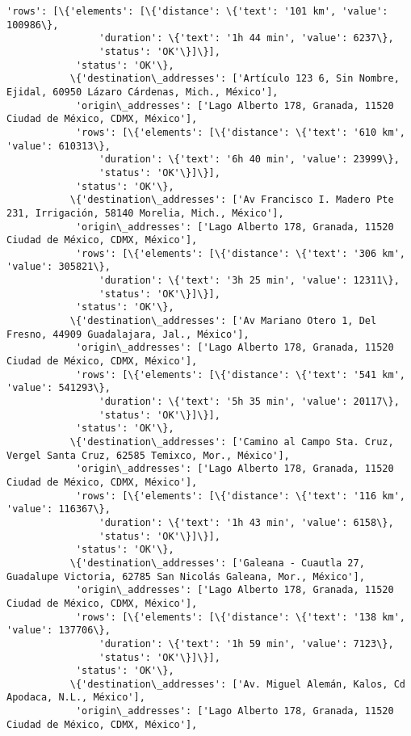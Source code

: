 \documentclass[11pt]{article}
\begin{document}
\begin{Verbatim}[commandchars=\\\{\}]
            'rows': [\{'elements': [\{'distance': \{'text': '101 km', 'value': 100986\},
                'duration': \{'text': '1h 44 min', 'value': 6237\},
                'status': 'OK'\}]\}],
            'status': 'OK'\},
           \{'destination\_addresses': ['Artículo 123 6, Sin Nombre, Ejidal, 60950 Lázaro Cárdenas, Mich., México'],
            'origin\_addresses': ['Lago Alberto 178, Granada, 11520 Ciudad de México, CDMX, México'],
            'rows': [\{'elements': [\{'distance': \{'text': '610 km', 'value': 610313\},
                'duration': \{'text': '6h 40 min', 'value': 23999\},
                'status': 'OK'\}]\}],
            'status': 'OK'\},
           \{'destination\_addresses': ['Av Francisco I. Madero Pte 231, Irrigación, 58140 Morelia, Mich., México'],
            'origin\_addresses': ['Lago Alberto 178, Granada, 11520 Ciudad de México, CDMX, México'],
            'rows': [\{'elements': [\{'distance': \{'text': '306 km', 'value': 305821\},
                'duration': \{'text': '3h 25 min', 'value': 12311\},
                'status': 'OK'\}]\}],
            'status': 'OK'\},
           \{'destination\_addresses': ['Av Mariano Otero 1, Del Fresno, 44909 Guadalajara, Jal., México'],
            'origin\_addresses': ['Lago Alberto 178, Granada, 11520 Ciudad de México, CDMX, México'],
            'rows': [\{'elements': [\{'distance': \{'text': '541 km', 'value': 541293\},
                'duration': \{'text': '5h 35 min', 'value': 20117\},
                'status': 'OK'\}]\}],
            'status': 'OK'\},
           \{'destination\_addresses': ['Camino al Campo Sta. Cruz, Vergel Santa Cruz, 62585 Temixco, Mor., México'],
            'origin\_addresses': ['Lago Alberto 178, Granada, 11520 Ciudad de México, CDMX, México'],
            'rows': [\{'elements': [\{'distance': \{'text': '116 km', 'value': 116367\},
                'duration': \{'text': '1h 43 min', 'value': 6158\},
                'status': 'OK'\}]\}],
            'status': 'OK'\},
           \{'destination\_addresses': ['Galeana - Cuautla 27, Guadalupe Victoria, 62785 San Nicolás Galeana, Mor., México'],
            'origin\_addresses': ['Lago Alberto 178, Granada, 11520 Ciudad de México, CDMX, México'],
            'rows': [\{'elements': [\{'distance': \{'text': '138 km', 'value': 137706\},
                'duration': \{'text': '1h 59 min', 'value': 7123\},
                'status': 'OK'\}]\}],
            'status': 'OK'\},
           \{'destination\_addresses': ['Av. Miguel Alemán, Kalos, Cd Apodaca, N.L., México'],
            'origin\_addresses': ['Lago Alberto 178, Granada, 11520 Ciudad de México, CDMX, México'],

\end{Verbatim}
\end{document}
